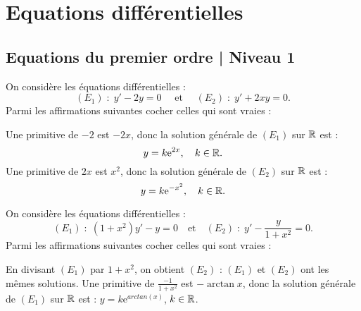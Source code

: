 
\section{Equations différentielles}
\subsection{Equations du premier ordre | Niveau 1}

\begin{question}
On considère les équations différentielles : 
$$(E_1)\; :\; y'-2y=0\quad \mbox{ et }\quad (E_2)\; :\; y'+2xy=0.$$
Parmi les affirmations suivantes cocher celles qui sont vraies :
\begin{answers}  
\end{answers}
\begin{explanations}
Une primitive de $-2$ est $-2x$, donc la solution générale de $(E_1)$ sur $\mathbb{R}$ est :
$$y=k\mathrm{e}^{2x},\quad k\in \mathbb{R}.$$
Une primitive de $2x$ est $x^2$, donc la solution générale de $(E_2)$ sur $\mathbb{R}$ est :
$$y=k\mathrm{e}^{-x^2},\quad k\in \mathbb{R}.$$
\end{explanations}
\end{question}

\begin{question}
On considère les équations différentielles :
$$(E_1)\; :\; (1+x^2)y'-y=0\quad\mbox{et}\quad (E_2)\; :\; y'-\frac{y}{1+x^2}=0.$$
Parmi les affirmations suivantes cocher celles qui sont vraies :
\begin{answers}  
\end{answers}
\begin{explanations}
En divisant $(E_1)$ par $1+x^2$, on obtient $(E_2)$ : $(E_1)$ et $(E_2)$ ont les mêmes solutions. Une primitive de $\displaystyle \frac{-1}{1+x^2}$ est $-\arctan x$, donc la solution générale de $(E_1)$ sur $\mathbb{R}$ est : $y=k\mathrm{e}^{arctan (x)}$, $k\in \mathbb{R}$.
\end{explanations}
\end{question}


